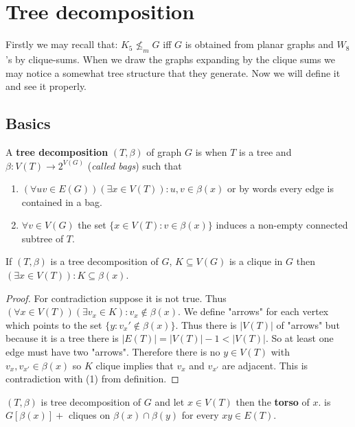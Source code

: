 \chapter{Tree decomposition}

Firstly we may recall that: $K_{5} \nleq_{m} G$ iff $G$ is obtained from planar graphs and $W_{8}$'s by clique-sums. When we draw the graphs expanding by the clique sums we may notice a somewhat tree structure that they generate. Now we will define it and see it properly.

\section{Basics}

\begin{defn}
	A \textbf{tree decomposition} $(T, \beta)$ of graph $G$ is when $T$ is a tree and $\beta: V(T) \to 2^{V(G)}$ (\textit{called bags}) such that
	
	\begin{enumerate}[(1)]
		\item $(\forall uv \in E(G)) (\exists x \in V(T)): u,v \in \beta(x)$ or by words every edge is contained in a bag.
		\item $\forall v \in V(G)$ the set $\{x \in V(T) : v \in \beta(x)\}$ induces a non-empty connected subtree of $T$.
	\end{enumerate}
\end{defn}

\begin{lemma}
	If $(T, \beta)$ is a tree decomposition of $G$, $K \subseteq V(G)$ is a clique in $G$ then $(\exists x \in V(T)) : K \subseteq \beta(x)$.
\end{lemma}

\begin{proof}
	For contradiction suppose it is not true. Thus $(\forall x \in V(T)) (\exists v_{x} \in K) : v_{x} \notin \beta(x)$. We define "arrows" for each vertex which points to the set $\{y : v_{x}' \notin \beta(x)\}$. Thus there is $|V(T)|$ of "arrows" but because it is a tree there is $|E(T)| = |V(T)| - 1 < |V(T)|$. So at least one edge must have two "arrows". Therefore there is no $y \in V(T)$ with $v_{x}, v_{x'} \in \beta(x)$ so $K$ clique implies that $v_{x}$ and $v_{x'}$ are adjacent. This is contradiction with (1) from definition.
\end{proof}

\begin{defn}
	$(T, \beta)$ is tree decomposition of $G$ and let $x \in V(T)$ then the \textbf{torso} of $x$. is $G[\beta(x)] + $ cliques on $\beta(x) \cap \beta(y)$ for every $xy \in E(T)$.
\end{defn}

